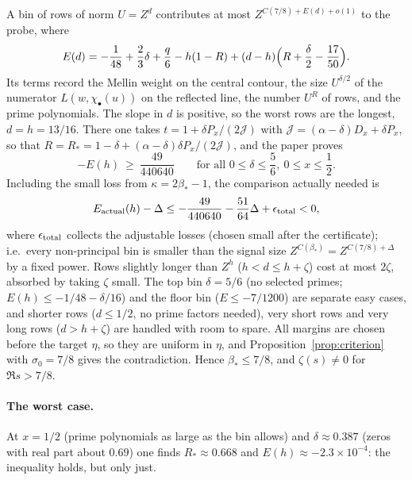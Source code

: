 \documentclass[11pt]{article}
\begin{document}
A bin of rows of norm $U=Z^d$ contributes at most $Z^{C(7/8)+E(d)+o(1)}$ to the
probe, where \cite[eq.\ common-high-exponent]{OAI78}
\[
 E(d)=-\frac1{48}+\frac23\delta+\frac q6-h(1-R)
 +(d-h)\Bigl(R+\frac\delta2-\frac{17}{50}\Bigr).
\]
Its terms record the Mellin weight on the central contour, the size
$U^{\delta/2}$ of the numerator $L(w,\chi_\bullet(u))$ on the reflected line,
the number $U^R$ of rows, and the prime polynomials. The slope in $d$ is
positive, so the worst rows are the longest, $d=h=13/16$. There one takes
$t=1+\delta P_x/(2\mathcal J)$ with
$\mathcal J=(\alpha-\delta)D_x+\delta P_x$, so that $R=R_*=1-\delta+(\alpha-\delta)\delta P_x/(2\mathcal J)$, and the
paper proves \cite[Lemma lem:balanced-endpoint]{OAI78}
\[
 -E(h)\ \ge\ \frac{49}{440640}\qquad\text{for all }0\le\delta\le\frac56,\ 0\le x\le\frac12 .
\]
Including the small loss from $\kappa=2\beta_*-1$, the comparison actually needed is
\[
 E_{\rm actual}(h)-\Delta\le-\frac{49}{440640}-\frac{51}{64}\Delta+\epsilon_{\rm total}<0,
\]
where $\epsilon_{\rm total}$ collects the adjustable losses (chosen small after the certificate);
i.e.\ every non-principal bin is smaller than the signal size $Z^{C(\beta_*)}=Z^{C(7/8)+\Delta}$ by a fixed power.
Rows slightly longer than $Z^h$ ($h<d\le h+\zeta$) cost at most $2\zeta$, absorbed by taking
$\zeta$ small. The top bin $\delta=5/6$ (no selected primes; $E(h)\le-1/48-\delta/16$) and the
floor bin ($E\le-7/1200$) are separate easy cases, and shorter rows ($d\le1/2$, no prime factors
needed), very short rows and very long rows ($d>h+\zeta$) are handled with room to spare. All margins are chosen before the target $\eta$, so they are uniform in $\eta$, and
Proposition~\ref{prop:criterion} with $\sigma_0=7/8$ gives the contradiction. Hence $\beta_*\le7/8$, and
$\zeta(s)\ne0$ for $\Re s>7/8$.

\paragraph{The worst case.} At $x=1/2$ (prime polynomials as large as the bin allows) and
$\delta\approx0.387$ (zeros with real part about $0.69$) one finds
$R_*\approx0.668$ and $E(h)\approx-2.3\times10^{-4}$: the inequality holds, but only just.
\end{document}
